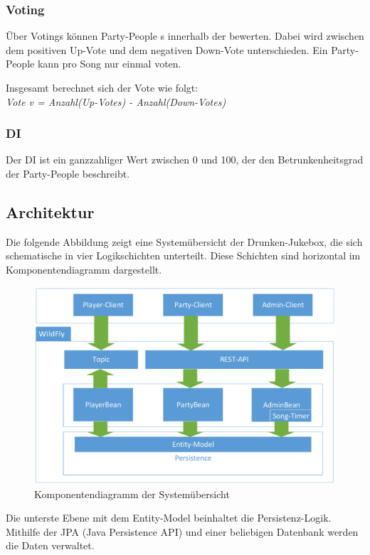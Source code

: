\subsubsection{Voting}
\label{sec:Voting}
Über Votings können Party-People s innerhalb der  bewerten. Dabei wird zwischen dem positiven Up-Vote und dem negativen Down-Vote unterschieden. Ein Party-People kann pro Song nur einmal voten.

Insgesamt berechnet sich der Vote wie folgt:\\
\textit{Vote v = Anzahl(Up-Votes) - Anzahl(Down-Votes)}

\subsubsection{DI}
\label{sec:DI}
Der DI ist ein ganzzahliger Wert zwischen 0 und 100, der den Betrunkenheitsgrad der Party-People beschreibt.

\subsection{Architektur}
\label{sec:Architektur}
Die folgende Abbildung zeigt eine Systemübersicht der Drunken-Jukebox, die sich schematische in vier Logikschichten unterteilt. Diese Schichten sind horizontal im Komponentendiagramm dargestellt.

\begin{figure}[H]
	\centering
	\includegraphics[width=1\linewidth]{Bilder/Komponentendiagramm_praesi}
	\caption{Komponentendiagramm der Systemübersicht }
	\label{fig:Komponentendiagramm}
\end{figure}

Die unterste Ebene mit dem Entity-Model beinhaltet die Persistenz-Logik. Mithilfe der JPA (Java Persistence API) und einer beliebigen Datenbank werden die Daten verwaltet.

